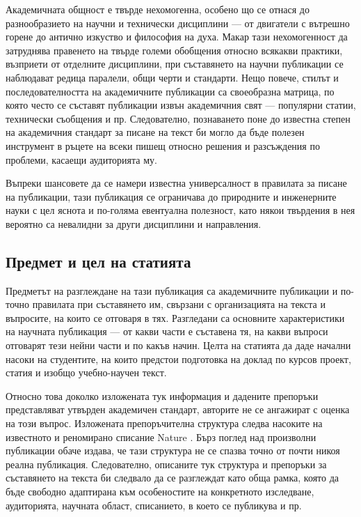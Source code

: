 \documentclass[11pt, oneside]{article}     %
\begin{document}
Академичната общност е твърде нехомогенна, особено що се отнася до разнообразието на научни и технически дисциплини --- от двигатели с вътрешно горене до антично изкуство и философия на духа. Макар тази  нехомогенност да затруднява правенето на твърде големи обобщения относно всякакви практики, възприети от отделните дисциплини, при съставянето на научни публикации се наблюдават редица паралели,  общи черти и стандарти. Нещо повече, стилът и последователността на академичните публикации са своеобразна матрица, по която често се съставят публикации извън академичния свят --- популярни статии, технически съобщения и пр. Следователно, познаването поне до известна степен на академичния стандарт за писане на текст би могло да бъде полезен инструмент в ръцете на всеки пишещ относно решения и разсъждения по проблеми, касаещи аудиторията му. 

Въпреки шансовете да се намери известна универсалност в правилата за писане на публикации, тази публикация се ограничава до природните и инженерните науки с цел яснота и по-голяма евентуална полезност, като някои твърдения в нея вероятно са невалидни за други дисциплини и направления.
 
\subsection*{Предмет и цел на статията}

Предметът на разглеждане на тази публикация са академичните публикации и по-точно правилата при съставянето им, свързани с организацията на текста и въпросите, на които се отговаря в тях. Разгледани са основните характеристики на научната публикация --- от какви части е съставена тя, на какви въпроси отговарят тези нейни части и по какъв начин. Целта на статията да даде начални насоки на студентите, на които предстои подготовка на доклад по курсов проект, статия и изобщо учебно-научен текст.

Относно това доколко изложената тук информация и дадените препоръки представляват утвърден академичен стандарт, авторите не се ангажират с оценка на този въпрос. Изложената препоръчителна структура следва насоките на известното и реномирано списание Nature \cite{nature}. Бърз поглед над произволни публикации обаче издава, че тази структура не се спазва точно от почти никоя реална публикация. Следователно, описаните тук структура и препоръки за съставянето на текста би следвало да се разглеждат като обща рамка, която да бъде свободно адаптирана към особеностите на конкретното изследване, аудиторията, научната област, списанието, в което се публикува и пр.
\end{document}
